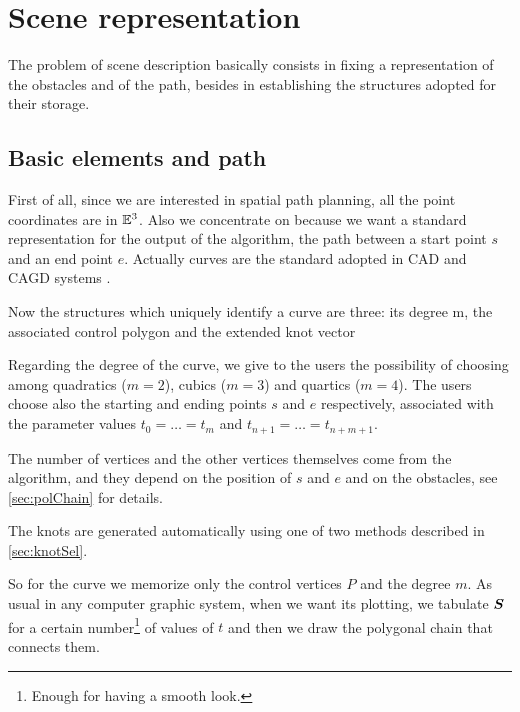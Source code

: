 \documentclass[dissertation.tex]{subfiles}
\begin{document}
\chapter{Scene representation}\label{cha:scene}
The problem of scene description basically consists in fixing a
representation of the obstacles and of the path, besides in establishing the structures adopted for their storage.

\section{Basic elements and path}
First of all, since we are interested in spatial path planning, all the point coordinates are in $\mathbb{E}^3$. Also we concentrate
on \bss because we want a standard representation for the output of
the algorithm, the path between a start point $s$ and an end point
$e$. Actually \bss
curves are the standard adopted in \ac{CAD} and
\ac{CAGD} systems \cite{hughes}\cite{foley}. 

Now the structures which  uniquely identify a \bs curve are
three: its degree m, the associated control polygon and the extended
knot vector 

Regarding the degree of the curve, we give
to the users the possibility of choosing among quadratics
($m=2$), cubics ($m=3$) and quartics ($m=4$). The users
choose also the starting and ending points $s$ and $e$ respectively,
associated with the parameter values $t_0=\dots=t_m$ and
$t_{n+1}=\dots=t_{n+m+1}$.

The number
of vertices and the other vertices themselves come from the algorithm,
and they depend on the position of $s$ and $e$ and on the obstacles, see
\cref{sec:polChain} for details.

The knots are generated automatically using one of two methods
described in \cref{sec:knotSel}.

So for the curve we memorize only the control vertices $P$ and the
degree 
$m$. As usual in any computer graphic system, when we want its plotting, we tabulate $\boldsymbol{S}$ for a certain
number\footnote{Enough for having a smooth look.} of values of $t$ and
then we draw the polygonal chain that connects them.
\end{document}
